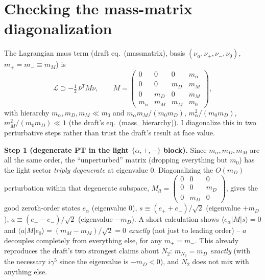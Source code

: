 \documentclass[11pt,a4paper]{article}
\begin{document}
\section{Checking the mass-matrix diagonalization}
\label{sec:massmatrix}

The Lagrangian mass term (draft eq.~(massmatrix), basis
$(\nu_\alpha,\nu_+,\nu_-,\nu_0)$, $m_+=m_-\equiv m_M$) is
\begin{equation}
  \mathcal L\supset -\tfrac12\,\bar\nu^T M\nu, \qquad
  M=\begin{pmatrix}0&0&0&m_\alpha\\0&0&m_D&m_M\\0&m_D&0&m_M\\
    m_\alpha&m_M&m_M&m_0\end{pmatrix},
\end{equation}
with hierarchy $m_\alpha,m_D,m_M\ll m_0$ and $m_\alpha m_M/(m_0m_D)$,
$m_\alpha^2/(m_0m_D)$, $m_M^2/(m_0m_D)\ll1$ (the draft's
eq.~(mass\_hierarchy)). I diagonalize this in two perturbative steps rather
than trust the draft's result at face value.

\textbf{Step 1 (degenerate PT in the light $\{\alpha,+,-\}$ block).}
Since $m_\alpha,m_D,m_M$ are all the same order, the ``unperturbed'' matrix
(dropping everything but $m_0$) has the light sector \emph{triply
degenerate} at eigenvalue 0. Diagonalizing the $O(m_D)$ perturbation within
that degenerate subspace, $M_{ll}=\begin{pmatrix}0&0&0\\0&0&m_D\\0&m_D&0\end{pmatrix}$,
gives the good zeroth-order states $e_\alpha$ (eigenvalue 0),
$s\equiv(e_++e_-)/\sqrt2$ (eigenvalue $+m_D$), $a\equiv(e_+-e_-)/\sqrt2$
(eigenvalue $-m_D$). A short calculation shows $\langle e_\alpha|M|s\rangle=0$
and $\langle a|M|e_0\rangle=(m_M-m_M)/\sqrt2=0$ \emph{exactly} (not just to
leading order) -- $a$ decouples completely from everything else, for any
$m_+=m_-$. This already reproduces the draft's two strongest claims about
$N_2$: $m_{N_2}=m_D$ \emph{exactly} (with the necessary $i\gamma^5$ since the
eigenvalue is $-m_D<0$), and $N_2$ does not mix with anything else.
\end{document}
